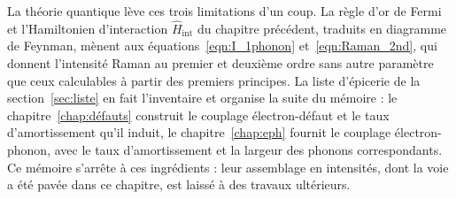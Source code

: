 La théorie quantique lève ces trois limitations d'un coup. La règle d'or de Fermi et l'Hamiltonien d'interaction $\hat{H}_\text{int}$
du chapitre précédent, traduits en diagramme de Feynman, mènent aux équations~\eqref{eqn:I_1phonon} et~\eqref{eqn:Raman_2nd}, qui donnent l'intensité Raman au premier et deuxième ordre sans autre paramètre que ceux calculables à partir des premiers principes. La liste d'épicerie de la section~\ref{sec:liste} en fait l'inventaire et organise la suite du mémoire : le chapitre~\ref{chap:défauts} construit le couplage électron-défaut et le taux d'amortissement qu'il induit, le chapitre~\ref{chap:eph} fournit le couplage électron-phonon, avec le taux d'amortissement et la largeur des phonons correspondants. Ce mémoire s'arrête à ces ingrédients : leur assemblage en intensités, dont la voie a été pavée dans ce chapitre, est laissé à des travaux ultérieurs. 


